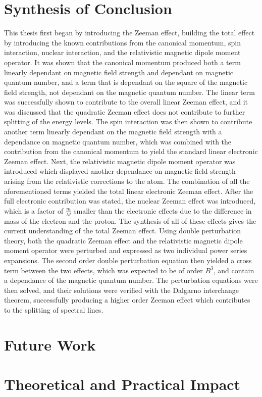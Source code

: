     \section{Synthesis of Conclusion}\label{sec:Synthesis}
        This thesis first began by introducing the Zeeman effect, building the total effect by introducing the known contributions from the canonical momentum, spin interaction, nuclear interaction, and the relativistic magnetic dipole moment operator. It was shown that the canonical momentum produced both a term linearly dependant on magnetic field strength and dependant on magnetic quantum number, and a term that is dependant on the square of the magnetic field strength, not dependant on the magnetic quantum number. The linear term was successfully shown to contribute to the overall linear Zeeman effect, and it was discussed that the quadratic Zeeman effect does not contribute to further splitting of the energy levels. The spin interaction was then shown to contribute another term linearly dependant on the magnetic field strength with a dependance on magnetic quantum number, which was combined with the contribution from the canonical momentum to yield the standard linear electronic Zeeman effect. Next, the relativistic magnetic dipole moment operator was introduced which displayed another dependance on magnetic field strength arising from the relativistic corrections to the atom. The combination of all the aforementioned terms yielded the total linear electronic Zeeman effect. After the full electronic contribution was stated, the nuclear Zeeman effect was introduced, which is a factor of $\frac{m}{M}$ smaller than the electronic effects due to the difference in mass of the electron and the proton. The synthesis of all of these effects gives the current understanding of the total Zeeman effect. Using double perturbation theory, both the quadratic Zeeman effect and the relativistic magnetic dipole moment operator were perturbed and expressed as two individual power series expansions. The second order double perturbation equation then yielded a cross term between the two effects, which was expected to be of order $B^3$, and contain a dependance of the magnetic quantum number. The perturbation equations were then solved, and their solutions were verified with the Dalgarno interchange theorem, successfully producing a higher order Zeeman effect which contributes to the splitting of spectral lines.\\

        
    \section{Future Work}\label{sec:FutureWork}
    \section{Theoretical and Practical Impact}\label{sec:PracticalImpact}